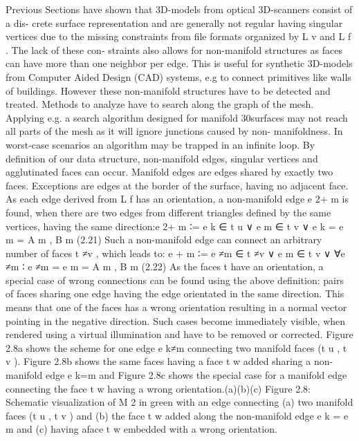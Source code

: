 Previous Sections have shown that 3D-models from optical 3D-scanners consist of a dis-
crete surface representation and are generally not regular having singular vertices due to
the missing constraints from file formats organized by L v and L f . The lack of these con-
straints also allows for non-manifold structures as faces can have more than one neighbor
per edge. This is useful for synthetic 3D-models from Computer Aided Design (CAD)
systems, e.g to connect primitives like walls of buildings. However these non-manifold
structures have to be detected and treated. Methods to analyze \tdd{} have to search
along the graph of the mesh. Applying e.g. a search algorithm designed for manifold
30surfaces may not reach all parts of the mesh as it will ignore junctions caused by non-
manifoldness. In worst-case scenarios an algorithm may be trapped in an infinite loop. By
definition of our data structure, non-manifold edges, singular vertices and agglutinated
faces can occur.
Manifold edges are edges shared by exactly two faces. Exceptions are edges at the
border of the surface, having no adjacent face. As each edge derived from L f has an
orientation, a non-manifold edge e 2+
m is found, when there are two edges from different
triangles defined by the same vertices, having the same direction:e 2+
m ∶= e k ∈ t u ∨ e m ∈ t v ∨ e k = e m = {A m , B m }(2.21)
Such a non-manifold edge can connect an arbitrary number of faces t ≠v , which leads to:
e + m ∶= e ≠m ∈ t ≠v ∨ e m ∈ t v ∨ ∀e ≠m ∶ e ≠m = e m = {A m , B m }(2.22)
As the faces t have an orientation, a special case of wrong connections can be found
using the above definition: pairs of faces sharing one edge having the edge orientated in
the same direction. This means that one of the faces has a wrong orientation resulting
in a normal vector pointing in the negative direction. Such cases become immediately
visible, when rendered using a virtual illumination and have to be removed or corrected.
Figure 2.8a shows the scheme for one edge e k≠m connecting two manifold faces (t u , t v ).
Figure 2.8b shows the same faces having a face t w added sharing a non-manifold edge
e k=m and Figure 2.8c shows the special case for a manifold edge connecting the face t w
having a wrong orientation.(a)(b)(c)
Figure 2.8: Schematic visualization of M 2 in green with an edge connecting (a) two manifold
faces (t u , t v ) and (b) the face t w added along the non-manifold edge e k = e m and
(c) having aface t w embedded with a wrong orientation.~\cite[p.~30-31]{Mara12}

